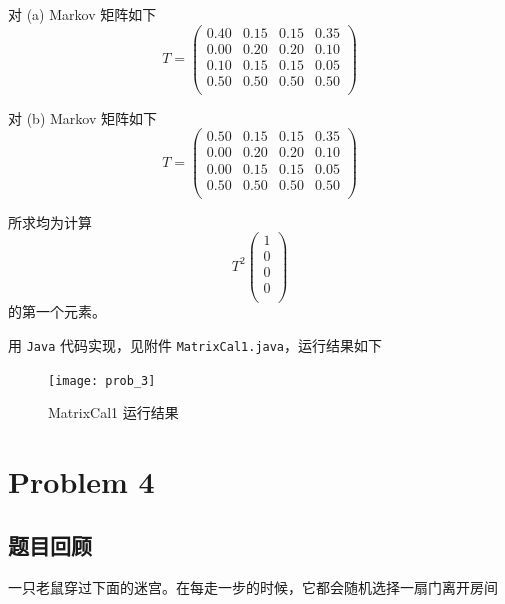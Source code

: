 \documentclass[12pt,a4paper]{article}%
\begin{document}
    对 (a) Markov 矩阵如下
    \begin{equation*}
        T = \left( \begin{matrix*}
                       0.40 & 0.15 & 0.15 & 0.35 \\
                       0.00 & 0.20 & 0.20 & 0.10 \\
                       0.10 & 0.15 & 0.15 & 0.05 \\
                       0.50 & 0.50 & 0.50 & 0.50 \\
        \end{matrix*} \right)
    \end{equation*}

    对 (b) Markov 矩阵如下
    \begin{equation*}
        T = \left( \begin{matrix*}
                       0.50 & 0.15 & 0.15 & 0.35 \\
                       0.00 & 0.20 & 0.20 & 0.10 \\
                       0.00 & 0.15 & 0.15 & 0.05 \\
                       0.50 & 0.50 & 0.50 & 0.50 \\
        \end{matrix*} \right)
    \end{equation*}

    所求均为计算
    \begin{equation*}
        T^2 \left( \begin{matrix*}
                       1 \\ 0 \\ 0 \\ 0 \\
        \end{matrix*} \right)
    \end{equation*}
    的第一个元素。

    用 \texttt{Java} 代码实现，见附件 \texttt{MatrixCal1.java}，运行结果如下
    \begin{figure}[h]
        \centering
        \texttt{[image: prob\_3]}
        \caption{MatrixCal1 运行结果}\label{fig:figure3}
    \end{figure}

\section{Problem 4}
\subsection{题目回顾}
一只老鼠穿过下面的迷宫。在每走一步的时候，它都会随机选择一扇门离开房间
\end{document}
